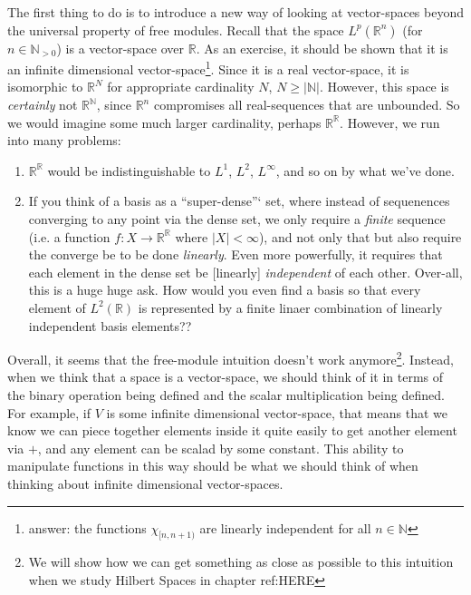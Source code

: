 \documentclass[oneside]{book}
\newcommand{\N}{\mathbb{N}}
\newcommand{\R}{\mathbb{R}}
\newcommand{\rw}{\rightarrow}
\begin{document}
The first thing to do is to introduce a new way of looking at vector-spaces beyond the universal property of free
modules. Recall  that the space $L^p(\R^n)$ (for $n \in \N_{>0}$) is a vector-space over $\R$. As an exercise, it should be shown that it is an infinite
dimensional vector-space\footnote{answer: the functions $\chi_{[n, n+1)}$ are linearly independent for all $n \in \N$}.
Since it is a real vector-space, it is isomorphic to $\R^N$ for appropriate cardinality $N$, $N \ge |\N|$. However, this space is
\emph{certainly} not $\R^\N$, since $\R^n$ compromises all real-sequences that are unbounded. So we would imagine some
much larger cardinality, perhaps $\R^\R$. However, we run into many problems:
\begin{enumerate}
	\item $\R^\R$ would be indistinguishable to $L^1$, $L^2$, $L^\infty$, and so on by what we've done.
	\item If you think of a basis as a ``super-dense''` set, where instead of sequenences converging to any point via
		the dense set, we only require a \emph{finite} sequence (i.e. a function $f: X \rw \R^\R$ where $|X| < \infty$),
		and not only that but also require the converge be to be done \emph{linearly}. Even more powerfully, it requires
		that each element in the dense set be [linearly] \emph{independent} of each other. Over-all, this is a huge huge
		ask. How would you even find a basis so that every element of $L^2(\R)$ is represented by a finite linaer combination of
		linearly independent basis elements??
\end{enumerate}

Overall, it seems that the free-module intuition doesn't work anymore\footnote{We will show how we can get something as
close as possible to this intuition when we study Hilbert Spaces in chapter ref:HERE}. Instead, when we think that
a space is a vector-space, we should think of it in terms of the binary operation being defined and the scalar
multiplication being defined. For example, if $V$ is some infinite dimensional vector-space, that means that we know we
can piece together elements inside it quite easily to get another element via $+$, and any element can be scalad by some
constant. This ability to manipulate functions in this way should be what we should think of when thinking about
infinite dimensional vector-spaces.
\end{document}
